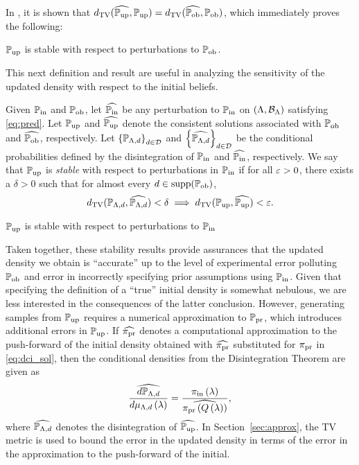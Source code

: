 In \cite{BJW18}, it is shown that $d_{\text{TV}} (\widehat{\operatorname*{\mathbb{P}_{up}}}, \operatorname*{\mathbb{P}_{up}}) = d_{\text{TV}} (\widehat{\operatorname*{\mathbb{P}_{ob}}}, \operatorname*{\mathbb{P}_{ob}})$, which immediately proves the following:

\begin{thm}
  $\operatorname*{\mathbb{P}_{up}}$ is stable with respect to perturbations to $\operatorname*{\mathbb{P}_{ob}}$.
  \label{thm:stableobs}
\end{thm}

This next definition and result are useful in analyzing the sensitivity of the updated density with respect to the initial beliefs.

\begin{defn}\label{defn:stableinitial}
  Given $\operatorname*{\mathbb{P}_{in}}$ and $\operatorname*{\mathbb{P}_{ob}}$, let $\widehat{\operatorname*{\mathbb{P}_{in}}}$ be any perturbation to $\operatorname*{\mathbb{P}_{in}}$ on $({\Lambda}, \mathcal{B}_{{\Lambda}})$ satisfying \eqref{eq:pred}.
  Let $\operatorname*{\mathbb{P}_{up}}$ and $\widehat{\operatorname*{\mathbb{P}_{up}}}$ denote the consistent solutions associated with $\operatorname*{\mathbb{P}_{ob}}$ and $\widehat{\operatorname*{\mathbb{P}_{ob}}}$, respectively.
  Let $\left\{\mathbb{P}_{{\Lambda}, d}\right\}_{d\in\mathcal{D}}^{}$ and $\left\{\widehat{\mathbb{P}_{{\Lambda}, d}}\right\}_{d\in\mathcal{D}}^{}$ be the conditional probabilities defined by the disintegration of $\operatorname*{\mathbb{P}_{in}}$ and $\widehat{\operatorname*{\mathbb{P}_{in}}}$, respectively.
  We say that $\operatorname*{\mathbb{P}_{up}}$ is \emph{stable} with respect to perturbations in $\operatorname*{\mathbb{P}_{in}}$ if for all $\varepsilon > 0$, there exists a $\delta > 0$ such that for almost every $d\in\text{supp}(\operatorname*{\mathbb{P}_{ob}})$,
  \begin{equation}\label{eq:stableinitial}
    d_{\text{TV}} (\mathbb{P}_{{\Lambda}, d}, \widehat{\mathbb{P}_{{\Lambda}, d}}) < \delta \implies d_{\text{TV}} (\operatorname*{\mathbb{P}_{up}}, \widehat{\operatorname*{\mathbb{P}_{up}}}) < \varepsilon.
  \end{equation}
\end{defn}

\begin{thm}
  $\operatorname*{\mathbb{P}_{up}}$ is stable with respect to perturbations to $\operatorname*{\mathbb{P}_{in}}$
  \label{thm:stableinitial}
\end{thm}

Taken together, these stability results provide assurances that the updated density we obtain is ``accurate'' up to the level of experimental error polluting $\operatorname*{\mathbb{P}_{ob}}$ and error in incorrectly specifying prior assumptions using $\operatorname*{\mathbb{P}_{in}}$.
Given that specifying the definition of a ``true'' initial density is somewhat nebulous, we are less interested in the consequences of the latter conclusion.
However, generating samples from $\operatorname*{\mathbb{P}_{up}}$ requires a numerical approximation to $\operatorname*{\mathbb{P}_{pr}}$, which introduces additional errors in $\operatorname*{\mathbb{P}_{up}}$.
If $\widehat{\operatorname*{\pi_{pr}}}$ denotes a computational approximation to the push-forward of the initial density obtained with $\widehat{\operatorname*{\pi_{pr}}}$ substituted for $\operatorname*{\pi_{pr}}$ in \eqref{eq:dci_sol}, then the conditional densities from the Disintegration Theorem are given as
\[
\frac{\widehat{d\mathbb{P}_{{\Lambda}, d}}}{d\mu_{{\Lambda}, d}\left ( \lambda \right )} = \frac{\operatorname*{\pi_{in}}\left ( \lambda \right )}{ \widehat{\operatorname*{\pi_{pr}}\left ( Q\left ( \lambda \right ) \right )} },
\]
where $\widehat{\mathbb{P}_{{\Lambda}, d}}$ denotes the disintegration of $\widehat{\operatorname*{\mathbb{P}_{up}}}$.
In Section~\ref{sec:approx}, the TV metric is used to bound the error in the updated density in terms of the error in the approximation to the push-forward of the initial.



